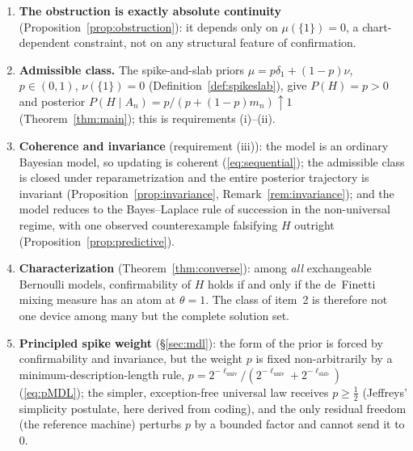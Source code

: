 \documentclass{amsart}
\theoremstyle{definition}
\begin{document}
\begin{enumerate}
\item \textbf{The obstruction is exactly absolute continuity}
(Proposition~\ref{prop:obstruction}): it depends only on $\mu(\{1\})=0$, a
chart-dependent constraint, not on any structural feature of confirmation.

\item \textbf{Admissible class.} The spike-and-slab priors
$\mu=p\delta_1+(1-p)\nu$, $p\in(0,1)$, $\nu(\{1\})=0$
(Definition~\ref{def:spikeslab}), give $P(H)=p>0$ and posterior
$P(H\mid A_n)=p/(p+(1-p)m_n)\uparrow1$
(Theorem~\ref{thm:main}); this is requirements (i)--(ii).

\item \textbf{Coherence and invariance} (requirement (iii)):
the model is an ordinary Bayesian model, so updating is coherent
(\eqref{eq:sequential}); the admissible class is closed under reparametrization
and the entire posterior trajectory is invariant
(Proposition~\ref{prop:invariance}, Remark~\ref{rem:invariance}); and the model
reduces to the Bayes--Laplace rule of succession in the non-universal regime,
with one observed counterexample falsifying $H$ outright
(Proposition~\ref{prop:predictive}).

\item \textbf{Characterization} (Theorem~\ref{thm:converse}): among
\emph{all} exchangeable Bernoulli models, confirmability of $H$ holds if and only
if the de~Finetti mixing measure has an atom at $\theta=1$. The class of item~2
is therefore not one device among many but the complete solution set.

\item \textbf{Principled spike weight} (\S\ref{sec:mdl}): the form of the prior
is forced by confirmability and invariance, but the weight $p$ is fixed
non\nobreakdash-arbitrarily by a minimum-description-length rule,
$p=2^{-\ell_{\mathrm{univ}}}/(2^{-\ell_{\mathrm{univ}}}+2^{-\ell_{\mathrm{slab}}})$
(\eqref{eq:pMDL}); the simpler, exception-free universal law receives
$p\ge\tfrac12$ (Jeffreys' simplicity postulate, here derived from coding), and the
only residual freedom (the reference machine) perturbs $p$ by a bounded factor and
cannot send it to $0$.


\end{enumerate}
\end{document}
